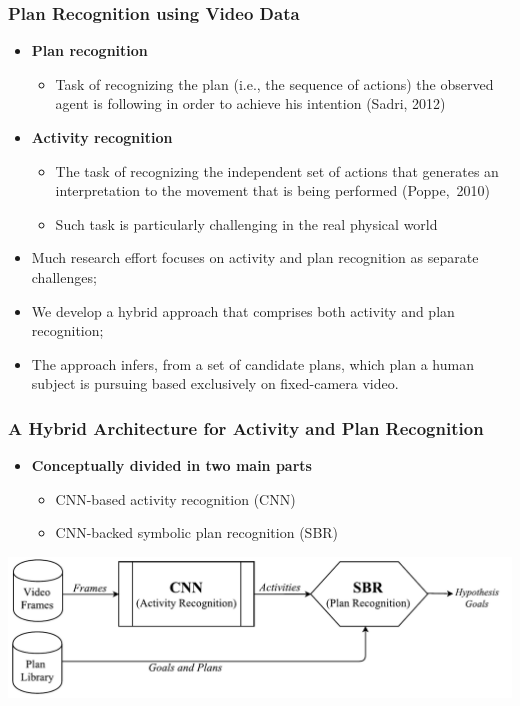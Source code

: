 \documentclass[usenames,dvipsnames]{beamer}
\begin{document}
\begin{frame}[c]\frametitle{Plan Recognition using Video Data}
	\begin{itemize}
   		\item \textbf{Plan recognition}
   		\begin{itemize}
				\item Task of recognizing the plan (i.e., the sequence of actions) the observed agent is following in order to achieve his intention (Sadri, 2012)
	    \end{itemize}
		\item \textbf{Activity recognition}
			\begin{itemize}
				\item The task of recognizing the independent set of actions that generates an interpretation to the movement that is being performed (Poppe,~2010)
				\item Such task is particularly challenging in the real physical world
			 \end{itemize}
		\item Much research effort focuses on activity and plan recognition as separate challenges;
		\item We develop a hybrid approach that comprises both activity and plan recognition;
		\item The approach infers, from a set of candidate plans, which plan a human subject is pursuing based exclusively on fixed-camera video.
	\end{itemize}
\end{frame}

\begin{frame}[c]\frametitle{A Hybrid Architecture for Activity and Plan Recognition}
   	\begin{itemize}
   		\item \textbf{Conceptually divided in two main parts}
   		\begin{itemize}
				\item CNN-based activity recognition (CNN)
                \item CNN-backed symbolic plan recognition (SBR)
	    \end{itemize}
	\end{itemize}
	\begin{center}
		\includegraphics[width=0.8\linewidth]{fig/pipeline.pdf}
	\end{center}
\end{frame}
\end{document}
